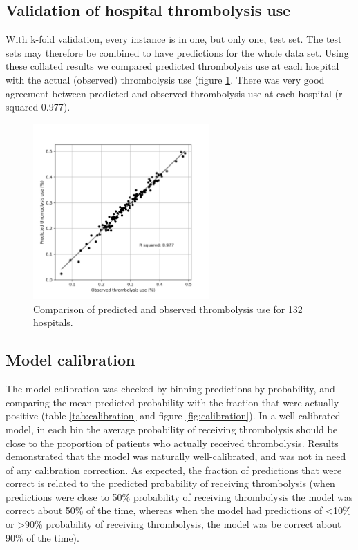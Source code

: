 
\subsection{Validation of hospital thrombolysis use}

With k-fold validation, every instance is in one, but only one, test set. The test sets may therefore be combined to have predictions for the whole data set. Using these collated results we compared predicted thrombolysis use at each hospital with the actual (observed) thrombolysis use (figure \ref{fig:thrombolysis_pred_observed}. There was very good agreement between predicted and observed thrombolysis use at each hospital (r-squared 0.977).

\begin{figure}
\centering
\includegraphics[width=0.6\textwidth]{./images/02_xgb_10_features_observed_predicted_rates}
\caption{Comparison of predicted and observed thrombolysis use for 132 hospitals.}
\label{fig:thrombolysis_pred_observed}
\end{figure}



\subsection{Model calibration}

The model calibration was checked by binning predictions by probability, and comparing the mean predicted probability with the fraction that were actually positive (table \ref{tab:calibration} and figure \ref{fig:calibration}). In a well-calibrated model, in each bin the average probability of receiving thrombolysis should be close to the proportion of patients who actually received thrombolysis. Results demonstrated that the model was naturally well-calibrated, and was not in need of any calibration correction. As expected, the fraction of predictions that were correct is related to the predicted probability of receiving thrombolysis (when predictions were close to 50\% probability of receiving thrombolysis the model was correct about 50\% of the time, whereas when the model had predictions of <10\% or >90\% probability of receiving thrombolysis, the model was be correct about 90\% of the time).

